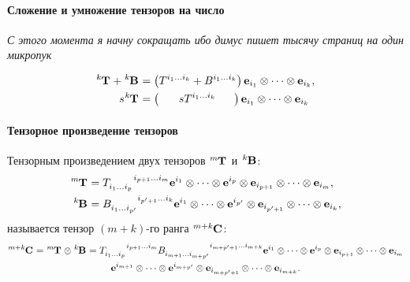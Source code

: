 \paragraph{Сложение и умножение тензоров на число}
\textit{С этого момента я начну сокращать ибо димус пишет тысячу страниц на один микропук}

\begin{align*}
	\tensor[^k]{\mathbf{T}}{} + \tensor[^k]{\mathbf{B}}{} &= \left(
	\tensor{T}{^{{i_1}\dots{i_k}}} + \tensor{B}{^{{i_1}\dots{i_k}}}
	\right) \mathbf{e}_{i_1}\otimes\dots\otimes \mathbf{e}_{i_k},\\
	s\tensor[^k]{\mathbf{T}}{} &= \left(\phantom{ttttt}s\tensor{T}{^{{i_1}\dots{i_k}}}\:\phantom{tttt}\right)\mathbf{e}_{i_1}\otimes\dots\otimes \mathbf{e}_{i_k}
\end{align*}

\paragraph{Тензорное произведение тензоров}
Тензорным произведением двух тензоров $\tensor[^m]{\mathbf{T}}{}$ и $\tensor[^k]{\mathbf{B}}{}$:
\begin{align*}
	\tensor[^m]{\mathbf{T}}{} &= \tensor{T}{_{i_1\dots i_p}^{i_{p+1}\dots i_m}}\mathbf{e}^{i_1}\otimes\dots\otimes\mathbf{e}^{i_p}\otimes\mathbf{e}_{i_{p+1}}\otimes\dots\otimes\mathbf{e}_{i_m},\\
	\tensor[^k]{\mathbf{B}}{} &= \tensor{B}{_{i_1\dots i_{p'}}^{i_{p'+1}\dots i_k}}\mathbf{e}^{i_1}\otimes\dots\otimes\mathbf{e}^{i_{p'}}\otimes\mathbf{e}_{i_{p'+1}}\otimes\dots\otimes\mathbf{e}_{i_k},
\end{align*}
называется тензор $(m+k)$-го ранга $\tensor[^{m+k}]{\mathbf{C}}{}$:
\begin{multline*}
	\tensor[^{m+k}]{\mathbf{C}}{} = \tensor[^m]{\mathbf{T}}{}\otimes\tensor[^k]{\mathbf{B}}{}=
	\tensor{T}{_{i_1\dots i_p}^{i_{p+1}\dots i_m}}\tensor{B}{_{i_{m+1}\dots i_{m+p'}}^{i_{m+p'+1}\dots i_{m+k}}}\mathbf{e}^{i_1}\otimes\dots\otimes\mathbf{e}^{i_p}\otimes\mathbf{e}_{i_{p+1}}\otimes\dots\otimes\mathbf{e}_{i_m}\\
	\mathbf{e}^{i_{m+1}}\otimes\dots\otimes\mathbf{e}^{i_{m+p'}}\otimes\mathbf{e}_{i_{m+p'+1}}\otimes\dots\otimes\mathbf{e}_{i_{m+k}}.
\end{multline*}
